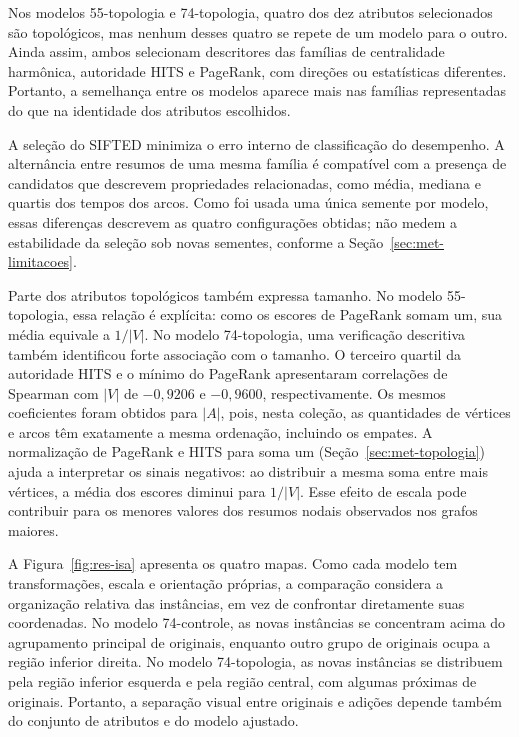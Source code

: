 Nos modelos 55-topologia e 74-topologia, quatro dos dez atributos
selecionados são topológicos, mas nenhum desses quatro se repete de
um modelo para o outro. Ainda assim, ambos selecionam descritores das
famílias de centralidade harmônica, autoridade HITS e PageRank, com
direções ou estatísticas diferentes. Portanto, a semelhança entre os
modelos aparece mais nas famílias representadas do que na identidade
dos atributos escolhidos.

A seleção do SIFTED minimiza o erro interno de classificação do
desempenho. A alternância entre resumos de uma mesma família é
compatível com a presença de candidatos que descrevem propriedades
relacionadas, como média, mediana e quartis dos tempos dos arcos.
Como foi usada uma única semente por modelo, essas diferenças descrevem
as quatro configurações obtidas; não medem a estabilidade da seleção
sob novas sementes, conforme a Seção~\ref{sec:met-limitacoes}.

Parte dos atributos topológicos também expressa tamanho. No modelo
55-topologia, essa relação é explícita:
como os escores de PageRank somam um, sua média equivale a $1/|V|$.
No modelo 74-topologia, uma verificação descritiva também identificou
forte associação com o tamanho. O terceiro quartil da autoridade HITS
e o mínimo do PageRank apresentaram correlações de Spearman com $|V|$
de $-0{,}9206$ e $-0{,}9600$, respectivamente. Os mesmos coeficientes
foram obtidos para $|A|$, pois, nesta coleção, as quantidades de vértices
e arcos têm exatamente a mesma ordenação, incluindo os empates.
A normalização de PageRank e HITS para soma um
(Seção~\ref{sec:met-topologia}) ajuda a interpretar os sinais negativos:
ao distribuir a mesma soma entre mais vértices, a média dos escores
diminui para $1/|V|$. Esse efeito de escala pode contribuir para os
menores valores dos resumos nodais observados nos grafos maiores.

A Figura~\ref{fig:res-isa} apresenta os quatro mapas. Como cada modelo
tem transformações, escala e orientação próprias, a comparação considera
a organização relativa das instâncias, em vez de confrontar diretamente
suas coordenadas. No modelo 74-controle, as novas instâncias se concentram acima do agrupamento
principal de originais, enquanto outro grupo de originais ocupa a região
inferior direita. No modelo 74-topologia, as novas instâncias se distribuem pela região inferior
esquerda e pela região central, com algumas próximas de originais.
Portanto, a separação visual entre originais e adições depende também
do conjunto de atributos e do modelo ajustado.

